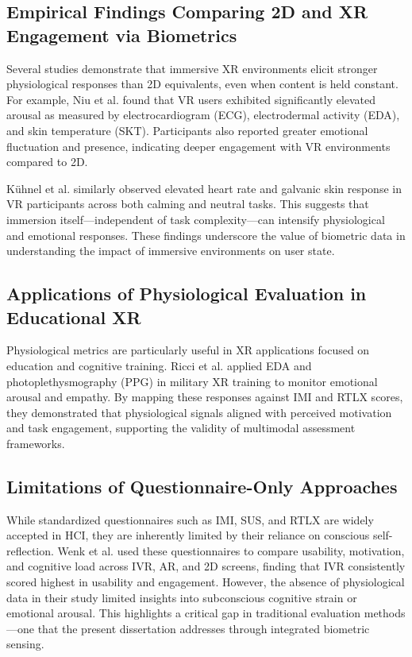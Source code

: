 \documentclass{CPP}
\begin{document}
\subsection{Empirical Findings Comparing 2D and XR Engagement via Biometrics}

Several studies demonstrate that immersive XR environments elicit stronger physiological responses than 2D equivalents, even when content is held constant. For example, Niu et al. \citep{Niu2019} found that VR users exhibited significantly elevated arousal as measured by electrocardiogram (ECG), electrodermal activity (EDA), and skin temperature (SKT). Participants also reported greater emotional fluctuation and presence, indicating deeper engagement with VR environments compared to 2D.

Kühnel et al. \citep{Kuhnel2023} similarly observed elevated heart rate and galvanic skin response in VR participants across both calming and neutral tasks. This suggests that immersion itself—independent of task complexity—can intensify physiological and emotional responses. These findings underscore the value of biometric data in understanding the impact of immersive environments on user state.

\subsection{Applications of Physiological Evaluation in Educational XR}

Physiological metrics are particularly useful in XR applications focused on education and cognitive training. Ricci et al. \citep{Ricci2024} applied EDA and photoplethysmography (PPG) in military XR training to monitor emotional arousal and empathy. By mapping these responses against IMI and RTLX scores, they demonstrated that physiological signals aligned with perceived motivation and task engagement, supporting the validity of multimodal assessment frameworks.

\subsection{Limitations of Questionnaire-Only Approaches}

While standardized questionnaires such as IMI, SUS, and RTLX are widely accepted in HCI, they are inherently limited by their reliance on conscious self-reflection. Wenk et al. \citep{Wenk2023} used these questionnaires to compare usability, motivation, and cognitive load across IVR, AR, and 2D screens, finding that IVR consistently scored highest in usability and engagement. However, the absence of physiological data in their study limited insights into subconscious cognitive strain or emotional arousal. This highlights a critical gap in traditional evaluation methods—one that the present dissertation addresses through integrated biometric sensing.
\end{document}
